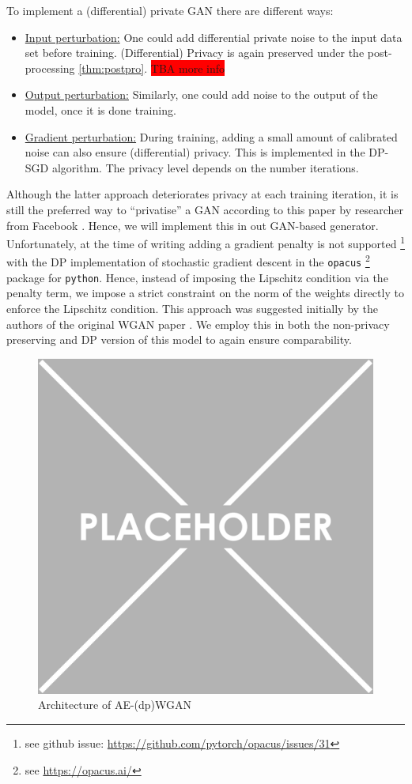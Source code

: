 To implement a (differential) private GAN there are different ways:
\begin{itemize}
    \item \underline{Input perturbation:} One could add differential private noise to the input data set before training. (Differential) Privacy is again preserved under the post-processing \cref{thm:postpro}. \colorbox{red}{TBA more info}
    \item \underline{Output perturbation:} Similarly, one could add noise to the output of the model, once it is done training. 
    \item \underline{Gradient perturbation:} During training, adding a small amount of calibrated noise can also ensure (differential) privacy. This is implemented in the DP-SGD algorithm. The privacy level depends on the number iterations. 
\end{itemize}
Although the latter approach deteriorates privacy at each training iteration, it is still the preferred way to ``privatise'' a GAN according to this paper by researcher from Facebook \parencite{vandermaaten2020tradeoffs}. Hence, we will implement this in out GAN-based generator. Unfortunately, at the time of writing adding a gradient penalty is not supported \footnote{see github issue: \href{https://github.com/pytorch/opacus/issues/31}{https://github.com/pytorch/opacus/issues/31}} with the DP implementation of stochastic gradient descent in the \texttt{opacus} \footnote{see \href{https://opacus.ai/}{https://opacus.ai/}} package for \texttt{python}. Hence, instead of imposing the Lipschitz condition via the penalty term, we impose a strict constraint on the norm of the weights directly to enforce the Lipschitz condition. This approach was suggested initially by the authors of the original WGAN paper \parencite{arjovsky2017wasserstein}. We employ this in both the non-privacy preserving and DP version of this model to again ensure comparability.

\begin{figure}[h]
    \centering
    \includegraphics[scale=0.5]{../images/placeholder.png}
    \caption{Architecture of AE-(dp)WGAN}
\end{figure}

